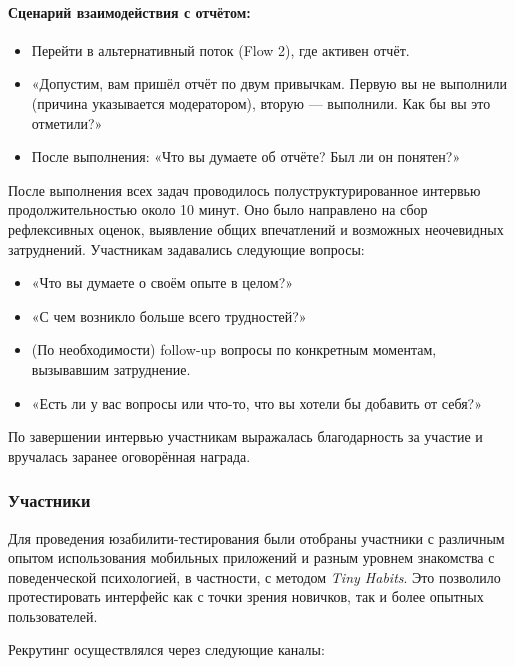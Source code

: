 \documentclass[pdflatex,sn-mathphys-num]{sn-jnl}%
\theoremstyle{thmstyleone}%
\theoremstyle{thmstyletwo}%
\theoremstyle{thmstylethree}%
\begin{document}
\paragraph{Сценарий взаимодействия с отчётом:}
\begin{itemize}
\item Перейти в альтернативный поток (Flow 2), где активен отчёт.
\item «Допустим, вам пришёл отчёт по двум привычкам. Первую вы не выполнили (причина указывается модератором), вторую — выполнили. Как бы вы это отметили?»
\item После выполнения: «Что вы думаете об отчёте? Был ли он понятен?»
\end{itemize}

После выполнения всех задач проводилось полуструктурированное интервью продолжительностью около 10 минут. Оно было направлено на сбор рефлексивных оценок, выявление общих впечатлений и возможных неочевидных затруднений. Участникам задавались следующие вопросы:

\begin{itemize}
\item «Что вы думаете о своём опыте в целом?»
\item «С чем возникло больше всего трудностей?»
\item (По необходимости) follow-up вопросы по конкретным моментам, вызывавшим затруднение.
\item «Есть ли у вас вопросы или что-то, что вы хотели бы добавить от себя?»
\end{itemize}

По завершении интервью участникам выражалась благодарность за участие и вручалась заранее оговорённая награда.

\subsubsection{Участники}

Для проведения юзабилити-тестирования были отобраны участники с различным опытом использования мобильных приложений и разным уровнем знакомства с поведенческой психологией, в частности, с методом \textit{Tiny Habits}. Это позволило протестировать интерфейс как с точки зрения новичков, так и более опытных пользователей.

Рекрутинг осуществлялся через следующие каналы:
\end{document}
